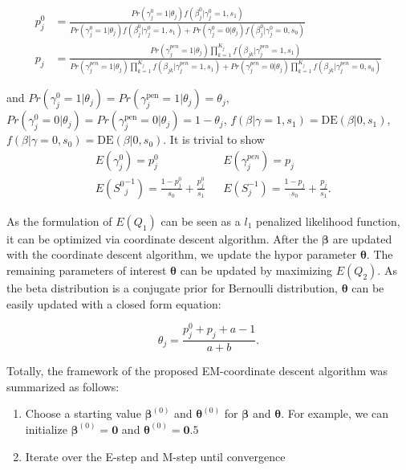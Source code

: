 \documentclass[AMA,STIX1COL,]{WileyNJD-v2}
\begin{document}
\[
\begin{aligned}
p_{j}^0 &= \frac{Pr(\gamma_{j}^0 = 1|\theta_j)f(\beta_{j}^0|\gamma_{j}^0=1, s_1) }{Pr(\gamma_{j}^0 = 1|\theta_j)f(\beta_{j}^0|\gamma_{j}^0=1, s_1) + Pr(\gamma_{j}^0 = 0|\theta_j)f(\beta^0_{j}|\gamma^0_{j}=0, s_0)}\\
p_{j} &= \frac{Pr(\gamma^{pen}_{j} = 1|\theta_j)\prod\limits_{k=1}^{K_j}f(\beta_{jk}|\gamma^{pen}_{j}=1, s_1) }{Pr(\gamma^{pen}_{j} = 1|\theta_j)\prod\limits_{k=1}^{K_j}f(\beta_{jk}|\gamma^{pen}_{j}=1, s_1) + Pr(\gamma^{pen}_{j} = 0|\theta_j)\prod\limits_{k=1}^{K_j}f(\beta_{jk}|\gamma^{pen}_{j}=0, s_0)}
\end{aligned}
\]

and
\(Pr(\gamma_{j}^{0} = 1|\theta_j) = Pr(\gamma_{j}^\text{pen}= 1|\theta_j) = \theta_j\),
\(Pr(\gamma_{j}^{0} = 0|\theta_j) = Pr(\gamma_{j}^\text{pen}= 0|\theta_j) = 1-\theta_j\),
\(f(\beta|\gamma=1, s_1) = \text{DE}(\beta|0 , s_1)\),
\(f(\beta|\gamma=0, s_0) = \text{DE}(\beta|0 , s_0)\). It is trivial to
show \[
\begin{aligned}
&E(\gamma^0_{j})  = p^0_{j} & &E(\gamma^{pen}_{j}) = p_{j}\\
&E({S^0}^{-1}_{j}) = \frac{1-p^{0}_{j}}{s_0} + \frac{p^{0}_{j}}{s_1} & &E(S^{-1}_{j}) = \frac{1-p_{j}}{s_0} + \frac{p_{j}}{s_1}.
\end{aligned}
\]

As the formulation of \(E(Q_1)\) can be seen as a \(l_1\) penalized
likelihood function, it can be optimized via coordinate descent
algorithm. After the \(\boldsymbol{\beta}\) are updated with the
coordinate descent algorithm, we update the hypor parameter
\(\boldsymbol{\theta}\). The remaining parameters of interest
\(\boldsymbol{\theta}\) can be updated by maximizing \(E(Q_2)\). As the
beta distribution is a conjugate prior for Bernoulli distribution,
\(\boldsymbol{\theta}\) can be easily updated with a closed form
equation:

\begin{equation}\label{eq:update_theta}
\theta_j = \frac{p^0_j + p_{j} + a - 1 }{a + b}.
\end{equation}

Totally, the framework of the proposed EM-coordinate descent algorithm
was summarized as follows:

\begin{enumerate}
\def\labelenumi{\arabic{enumi})}
\item
  Choose a starting value \(\boldsymbol{\beta}^{(0)}\) and
  \(\boldsymbol{\theta}^{(0)}\) for \(\boldsymbol{\beta}\) and
  \(\boldsymbol{\theta}\). For example, we can initialize
  \(\boldsymbol{\beta}^{(0)} = \boldsymbol{0}\) and
  \(\boldsymbol{\theta}^{(0)} = \boldsymbol{0}.5\)
\item
  Iterate over the E-step and M-step until convergence
\end{enumerate}
\end{document}
